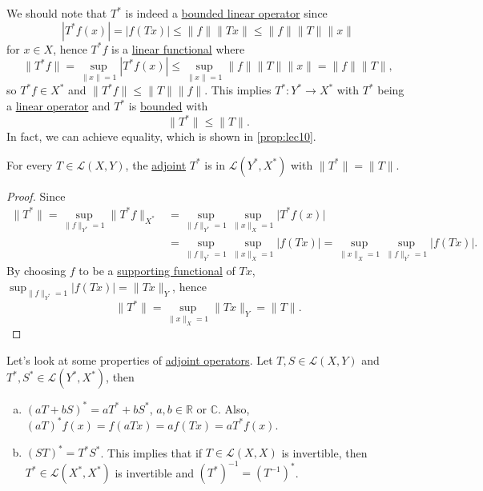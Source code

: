 We should note that \(T^{\ast} \) is indeed a \hyperref[def:bounded-linear-op]{bounded linear operator} since
\[
	\left\vert T^{\ast} f(x) \right\vert = \left\vert f(Tx) \right\vert \leq \lVert f\rVert \lVert Tx\rVert \leq \lVert f\rVert \lVert T\rVert \lVert x\rVert
\]
for \(x\in X\), hence \(T^{\ast} f\) is a \hyperref[def:linear-functional]{linear functional} where
\[
	\lVert T^{\ast} f\rVert = \sup_{\lVert x\rVert = 1} \left\vert T^{\ast} f(x) \right\vert \leq \sup _{\lVert x\rVert = 1}\lVert f\rVert \lVert T\rVert \lVert x\rVert = \lVert f\rVert \lVert T\rVert,
\]
so \(T^{\ast} f\in X^{\ast} \) and \(\lVert T^{\ast} f\rVert \leq \lVert T\rVert \lVert f\rVert \). This implies \(T^{\ast} \colon Y^{\ast} \to X^{\ast} \) with \(T^{\ast} \) being a \hyperref[def:linear-op]{linear operator} and \(T^{\ast} \) is \hyperref[def:bounded-linear-op]{bounded} with
\[
	\lVert T^{\ast} \rVert \leq \lVert T\rVert .
\]
In fact, we can achieve equality, which is shown in \autoref{prop:lec10}.

\begin{proposition}\label{prop:lec10}
	For every \(T\in \mathcal{L} (X,Y)\), the \hyperref[def:adjoint-op]{adjoint} \(T^{\ast} \) is in \(\mathcal{L} (Y^{\ast} , X^{\ast} )\) with \(\lVert T^{\ast} \rVert = \lVert T\rVert \).
\end{proposition}
\begin{proof}
	Since
	\[
		\begin{split}
			\lVert T^{\ast}  \rVert
			= \sup _{\lVert f \rVert _{Y^{\ast} }= 1}\lVert T^{\ast} f \rVert _{X^{\ast} }
			 & = \sup _{\lVert f \rVert _{Y^{\ast} } = 1} \sup _{\lVert x \rVert _X = 1}\vert T^{\ast} f(x)  \vert \\
			 & = \sup_{\lVert f \rVert _{Y^{\ast} }= 1}\sup _{\lVert x \rVert _X = 1} \vert f(Tx)  \vert
			= \sup _{\lVert x \rVert _X = 1} \sup _{\lVert f \rVert _{Y^{\ast} } = 1} \vert f(Tx)  \vert.
		\end{split}
	\]
	By choosing \(f\) to be a \hyperref[thm:supporting-functional]{supporting functional} of \(Tx\), \(\sup _{\lVert f \rVert _{Y^{\ast} }=1}\vert f(Tx)  \vert = \lVert Tx \rVert _{Y}\), hence
	\[
		\lVert T^{\ast} \rVert
		= \sup _{\lVert x \rVert _X = 1} \lVert Tx \rVert _{Y}
		= \lVert T \rVert.
	\]
\end{proof}

Let's look at some properties of \hyperref[def:adjoint-op]{adjoint operators}. Let \(T, S\in \mathcal{L} (X, Y)\) and \(T^{\ast} , S^{\ast} \in \mathcal{L} (Y^{\ast} , X^{\ast} )\), then
\begin{enumerate}[(a)]
	\item \((aT + bS)^{\ast} = aT^{\ast} + bS^{\ast} \), \(a, b\in \mathbb{R} \) or \(\mathbb{C} \). Also, \((aT)^{\ast} f(x) = f(aTx) = af(Tx) = aT^{\ast} f(x)\).
	\item \((ST)^{\ast} = T^{\ast} S^{\ast} \). This implies that if \(T\in \mathcal{L} (X, X)\) is invertible, then \(T^{\ast} \in \mathcal{L} (X^{\ast} , X^{\ast} )\) is invertible and \((T^{\ast} )^{-1} = (T^{-1} )^{\ast} \).
\end{enumerate}

